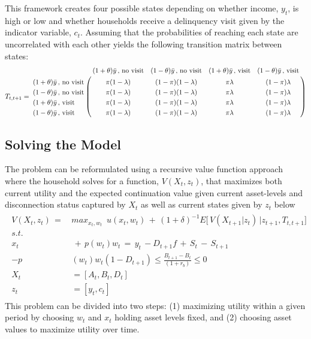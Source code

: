 \documentclass[12pt]{article}
\begin{document}
This framework creates four possible states depending on whether income, $y_t$, is high or low and whether households receive a delinquency visit given by the indicator variable, $c_t$.  Assuming that the probabilities of reaching each state are uncorrelated with each other yields the following transition matrix between states:
\begin{align*}
T_{t,t+1} = \bordermatrix{\text{} & (1+\theta)\bar{y}\,,\,\text{no visit} & (1-\theta)\bar{y}\,,\,\text{no visit} & (1+\theta)\bar{y}\,,\,\text{visit} & (1-\theta)\bar{y}\,,\,\text{visit} \cr
                (1+\theta)\bar{y}\,,\,\text{no visit} & \pi (1-\lambda) & (1-\pi) (1-\lambda) & \pi \lambda & (1-\pi) \lambda  \cr
                (1-\theta)\bar{y}\,,\,\text{no visit} & \pi (1-\lambda) & (1-\pi) (1-\lambda) & \pi \lambda & (1-\pi) \lambda  \cr
                (1+\theta)\bar{y}\,,\,\text{visit}    & \pi (1-\lambda) & (1-\pi) (1-\lambda) & \pi \lambda & (1-\pi) \lambda  \cr
                (1-\theta)\bar{y}\,,\,\text{visit}  & \pi (1-\lambda) & (1-\pi) (1-\lambda) & \pi \lambda &  (1-\pi) \lambda  }
\end{align*}


\subsection{Solving the Model}

The problem can be reformulated using a recursive value function approach where the household solves for a function, $V(X_t,z_t)$, that maximizes both current utility and the expected continuation value given current asset-levels and disconnection status captured by $X_t$ as well as current states given by $z_t$ below
\begin{align}\label{eq:valmax}
\begin{split}
V(X_t,z_t) \,=\, &max_{x_t,w_t}  \,\,\, u(x_t,w_t) \,+\, (1+\delta)^{-1} E \Big[\, V(X_{t+1}|z_{t})\,\Big| z_{t+1}, T_{t,t+1} \Big]
\\
s.t.& \\
x_t & \, + \, p(w_t) w_t \, = \, y_t \, - D_{t+1} f  \, + \, S_t \, - \, S_{t+1} \\
-p&(w_t) w_t (1-D_{t+1}) \leq \frac{B_{t+1}-B_t}{(1+r_b)} \leq 0  \\
X_t &= [A_{t},B_{t},D_{t}] \\
z_t &= [y_t,c_t]
\end{split} 
\end{align}
This problem can be divided into two steps: (1) maximizing utility within a given period by choosing $w_t$ and $x_t$ holding asset levels fixed, and (2) choosing asset values to maximize utility over time.
\end{document}
